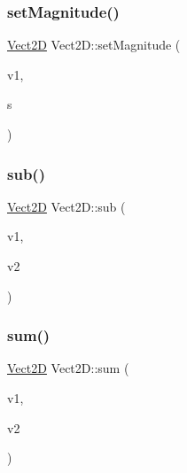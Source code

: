 \mbox{\label{classVect2D_a2d33dc31e186617af5a6919f1e94e39f_a2d33dc31e186617af5a6919f1e94e39f}} 
\subsubsection{\texorpdfstring{set\+Magnitude()}{setMagnitude()}\hspace{0.1cm}{\footnotesize\ttfamily [3/3]}}
{\footnotesize\ttfamily \hyperlink{classVect2D}{Vect2D} Vect2\+D\+::set\+Magnitude (\begin{DoxyParamCaption}\item[{const \hyperlink{classVect2D}{Vect2D} \&}]{v1,  }\item[{double}]{s }\end{DoxyParamCaption})\hspace{0.3cm}{\ttfamily [static]}}

\mbox{\label{classVect2D_a338c5688a1264ece021066dff5c96f32_a338c5688a1264ece021066dff5c96f32}} 
\subsubsection{\texorpdfstring{sub()}{sub()}}
{\footnotesize\ttfamily \hyperlink{classVect2D}{Vect2D} Vect2\+D\+::sub (\begin{DoxyParamCaption}\item[{const \hyperlink{classVect2D}{Vect2D} \&}]{v1,  }\item[{const \hyperlink{classVect2D}{Vect2D} \&}]{v2 }\end{DoxyParamCaption})\hspace{0.3cm}{\ttfamily [static]}}

\mbox{\label{classVect2D_a41c1598c79a24bf2d819f2762cb83d58_a41c1598c79a24bf2d819f2762cb83d58}} 
\subsubsection{\texorpdfstring{sum()}{sum()}}
{\footnotesize\ttfamily \hyperlink{classVect2D}{Vect2D} Vect2\+D\+::sum (\begin{DoxyParamCaption}\item[{const \hyperlink{classVect2D}{Vect2D} \&}]{v1,  }\item[{const \hyperlink{classVect2D}{Vect2D} \&}]{v2 }\end{DoxyParamCaption})\hspace{0.3cm}{\ttfamily [static]}}

